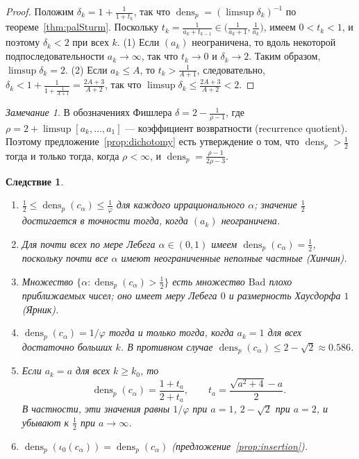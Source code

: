 \documentclass[a4paper,14pt]{extreport}
\theoremstyle{plain}
\newtheorem{corollary}[theorem]{Следствие}
\theoremstyle{definition}
\theoremstyle{remark}
\newtheorem{remark}{Замечание}
\begin{document}
\begin{proof}
	Положим $\delta_k=1+\frac1{1+t_k}$, так что $\operatorname{dens}_p=(\limsup\delta_k)^{-1}$ по теореме~\ref{thm:palSturm}.
	Поскольку $t_k=\frac1{a_k+t_{k-1}}\in\bigl(\frac1{a_k+1},\frac1{a_k}\bigr)$, имеем $0<t_k<1$, и поэтому $\delta_k<2$ при всех $k$.
	(1) Если $(a_k)$ неограничена, то вдоль некоторой подпоследовательности $a_k\to\infty$, так что $t_k\to0$ и $\delta_k\to2$. Таким образом, $\limsup\delta_k=2$.
	(2) Если $a_k\le A$, то $t_k>\frac1{A+1}$, следовательно, $\delta_k<1+\frac{1}{1+\frac1{A+1}}=\frac{2A+3}{A+2}$, так что $\limsup\delta_k\le\frac{2A+3}{A+2}<2$.
\end{proof}

\begin{remark}
	В обозначениях Фишлера $\delta=2-\frac1{\rho-1}$, где $\rho=2+\limsup[a_k,\dots,a_1]$ --- коэффициент возвратности (recurrence quotient). Поэтому предложение~\ref{prop:dichotomy} есть утверждение о том, что $\operatorname{dens}_p>\frac12$ тогда и только тогда, когда $\rho<\infty$, и $\operatorname{dens}_p=\frac{\rho-1}{2\rho-3}$.
\end{remark}

\begin{corollary}\label{cor:palSturm}
	\begin{enumerate}
		\item $\tfrac12\le\operatorname{dens}_p(c_\alpha)\le\tfrac1\varphi$ для каждого иррационального $\alpha$; значение $\tfrac12$ достигается в точности тогда, когда $(a_k)$ неограничена.
		\item Для почти всех по мере Лебега $\alpha\in(0,1)$ имеем $\operatorname{dens}_p(c_\alpha)=\tfrac12$, поскольку почти все $\alpha$ имеют неограниченные неполные частные (Хинчин).
		\item Множество $\{\alpha:\operatorname{dens}_p(c_\alpha)>\tfrac12\}$ есть множество $\mathrm{Bad}$ плохо приближаемых чисел; оно имеет меру Лебега $0$ и размерность Хаусдорфа $1$ (Ярник).
		\item $\operatorname{dens}_p(c_\alpha)=1/\varphi$ тогда и только тогда, когда $a_k=1$ для всех достаточно больших $k$. В противном случае $\operatorname{dens}_p(c_\alpha)\le 2-\sqrt2\approx0.586$.
		\item Если $a_k=a$ для всех $k\ge k_0$, то
		\begin{equation}
			\operatorname{dens}_p(c_\alpha)=\frac{1+t_a}{2+t_a},\qquad t_a=\frac{\sqrt{a^2+4}-a}{2}.
		\end{equation}
		В частности, эти значения равны $1/\varphi$ при $a=1$, $2-\sqrt2$ при $a=2$, и убывают к $\tfrac12$ при $a\to\infty$.
		\item $\operatorname{dens}_p(\iota_0(c_\alpha))=\operatorname{dens}_p(c_\alpha)$ (предложение~\ref{prop:insertion}).
	\end{enumerate}
\end{corollary}
\end{document}
